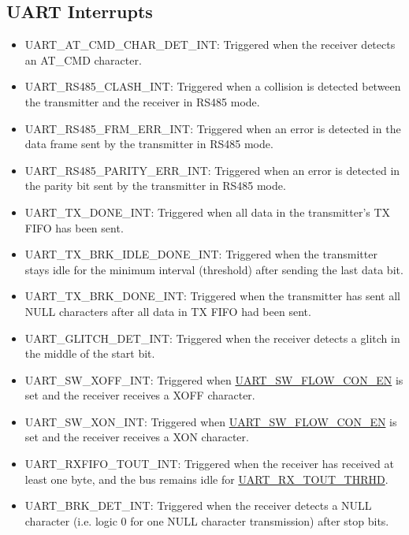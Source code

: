 \documentclass[main\_\_EN.tex]{subfiles}
\begin{document}
\subsection{UART Interrupts}
\begin{itemize}
\item \label{int:UARTATCMDCHARDETINT}UART\_AT\_CMD\_CHAR\_DET\_INT: Triggered when the receiver detects an AT\_CMD character.
\item \label{int:UARTRS485CLASHINT}UART\_RS485\_CLASH\_INT: Triggered when a collision is detected between the transmitter and the receiver in RS485 mode.
\item \label{int:UARTRS485FRMERRINT}UART\_RS485\_FRM\_ERR\_INT: Triggered when an error is detected in the data frame sent by the transmitter in RS485 mode.
\item \label{int:UARTRS485PARITYERRINT}UART\_RS485\_PARITY\_ERR\_INT: Triggered when an error is detected in the parity bit sent by the transmitter in RS485 mode.
\item \label{int:UARTTXDONEINT}UART\_TX\_DONE\_INT: Triggered when all data in the transmitter's TX FIFO has been sent.
\item \label{int:UARTTXBRKIDLEDONEINT}UART\_TX\_BRK\_IDLE\_DONE\_INT: Triggered when the transmitter stays idle for the minimum interval (threshold) after sending the last data bit.
\item \label{int:UARTTXBRKDONEINT}UART\_TX\_BRK\_DONE\_INT: Triggered when the transmitter has sent all NULL characters after all data in TX FIFO had been sent.
\item \label{int:UARTGLITCHDETINT}UART\_GLITCH\_DET\_INT: Triggered when the receiver detects a glitch in the middle of the start bit.
\item \label{int:UARTSWXOFFINT}UART\_SW\_XOFF\_INT: Triggered when \hyperref[fielddesc:UARTSWFLOWCONEN]{UART\_SW\_FLOW\_CON\_EN} is set and the receiver receives a XOFF character.
\item \label{int:UARTSWXONINT}UART\_SW\_XON\_INT: Triggered when \hyperref[fielddesc:UARTSWFLOWCONEN]{UART\_SW\_FLOW\_CON\_EN} is set and the receiver receives a XON character.
\item \label{int:UARTRXFIFOTOUTINT}UART\_RXFIFO\_TOUT\_INT: Triggered when the receiver has received at least one byte, and the bus remains idle for \hyperref[fielddesc:UARTRXTOUTTHRHD]{UART\_RX\_TOUT\_THRHD}.
\item \label{int:UARTBRKDETINT}UART\_BRK\_DET\_INT: Triggered when the receiver detects a NULL character (i.e. logic 0 for one NULL character transmission) after stop bits.

\end{itemize}
\end{document}
